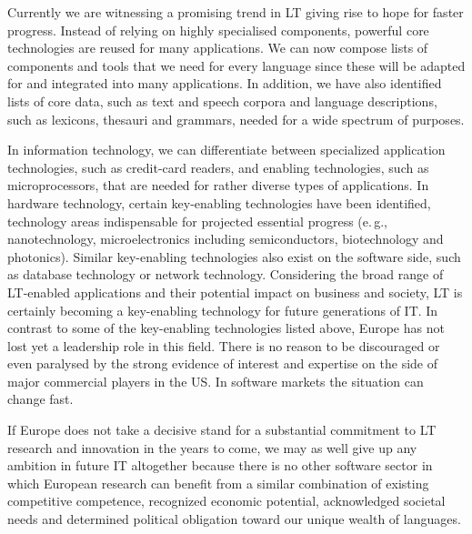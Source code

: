 \documentclass[10pt, plain]{../../metanetpaper}
\begin{document}
\begin{multicols}{2}
Currently we are witnessing a promising trend in LT giving rise to hope for faster progress. Instead of relying on highly specialised components, powerful core technologies are reused for many applications. We can now compose lists of components and tools that we need for every language since these will be adapted for and integrated into many applications. In addition, we have also identified lists of core data, such as text and speech corpora and language descriptions, such as lexicons, thesauri and grammars, needed for a wide spectrum of purposes.


In information technology, we can differentiate between specialized application technologies, such as credit-card readers, and enabling technologies, such as microprocessors, that are needed for rather diverse types of applications. In hardware technology, certain key-enabling technologies have been identified, technology areas indispensable for projected essential progress (e.\,g., nanotechnology, microelectronics including semiconductors, biotechnology and photonics). Similar key-enabling technologies also exist on the software side, such as database technology or network technology. Considering the broad range of LT-enabled applications and their potential impact on business and society, LT is certainly becoming a key-enabling technology for future generations of IT. In contrast to some of the key-enabling technologies listed above, Europe has not lost yet a leadership role in this field. There is no reason to be discouraged or even paralysed by the strong evidence of interest and expertise on the side of major commercial players in the US. In software markets the situation can change fast.
 
If Europe does not take a decisive stand for a substantial commitment to LT research and innovation in the years to come, we may as well give up any ambition in future IT altogether because there is no other software sector in which European research can benefit from a similar combination of existing competitive competence, recognized economic potential, acknowledged societal needs and determined political obligation toward our unique wealth of languages.
\end{multicols}

\clearpage

\end{document}
